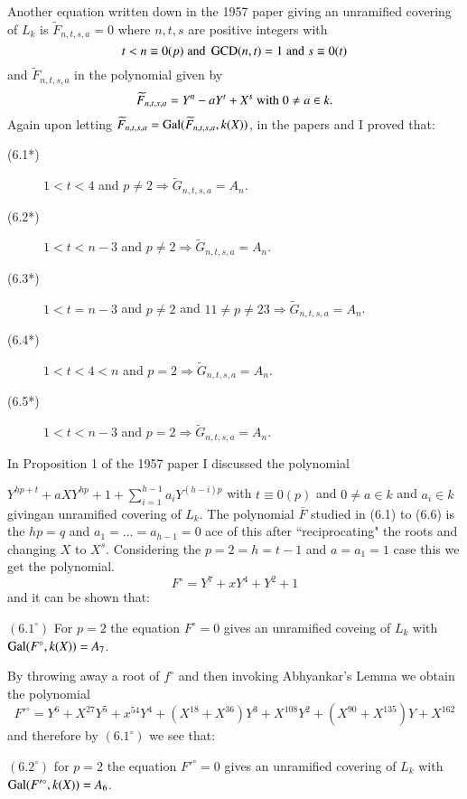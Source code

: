 Another equation written down in the 1957 paper giving an unramified covering of $L_{k}$ is $\widetilde{F}_{n,t,s,a}=0$ where $n,t,s$ are positive integers with
$$
t < n \equiv 0(p)\; {\rm and}\; \operatorname{GCD}(n,t)=1\; {\rm and}\; s \equiv 0(t) 
$$
and $\widetilde{F}_{n,t,s,a}$ in the polynomial given by
$$
\widetilde{F}_{n,t,s,a}=Y^{n}-aY^{t}+X^{s}\; {\rm with}\; 0\neq a \in k. 
$$
Again upon letting $\widetilde{F}_{n,t,s,a}=\operatorname{Gal}(\widetilde{F}_{n,t,s,a}, k(X))$, in the papers \cite{chap1-key8} and \cite{chap1-key10} I proved that:
\begin{description}
\item[{\rm (6.1*)}] $1 < t < 4$ and $p\neq 2 \Rightarrow \widetilde{G}_{n,t,s,a}= A_{n}$.
\item[{\rm (6.2*)}] $1 < t < n-3$ and $p \neq 2 \Rightarrow \widetilde{G}_{n,t,s,a}= A_{n}$.
\item[{\rm (6.3*)}] $1 < t = n-3$ and $p \neq 2$ and $11\neq p \neq 23 \Rightarrow \widetilde{G}_{n,t,s,a}= A_{n}$.
\item[{\rm (6.4*)}] $1 < t < 4 < n$ and $p = 2 \Rightarrow \widetilde{G}_{n,t,s,a}= A_{n}$.
\item[{\rm (6.5*)}] $1 < t < n-3$ and $p = 2 \Rightarrow \widetilde{G}_{n,t,s,a}= A_{n}$.
\end{description} 
In Proposition 1 of the 1957 paper I discussed the polynomial

$Y^{hp+t} +aXY^{hp} + 1 + \sum\limits_{i=1}^{h-1}a_{i}Y^{(h-i)p}$ with $t\equiv 0(p)$ and $0 \neq a \in k$  and $a_{i} \in k $ giving\pageoriginale an unramified covering of $L_{k}$. The polynomial $\overline{F}$ studied in (6.1) to (6.6) is the $hp=q $ and $ a_{1}= \ldots = a_{h-1} =0$ ace of this after ``reciprocating" the roots and changing $X$ to $X^{s}$. Considering the $p=2 =h = t-1$ and $a = a_{1} = 1$ case this we get the polynomial. 
$$
F^{\circ} =Y^{7} +xY^{4}+Y^{2}+1
$$
and it can be shown that:

$(6.1^{\circ})$ For $p=2$ the equation $F^{\circ}=0$ gives an unramified coveing of $L_{k}$ with $\operatorname{Gal}(F^{\circ}, k(X))=A_{7}$.

By throwing away a root of $f^{\circ}$ and then invoking Abhyankar's Lemma we obtain the polynomial
$$ 
F'^{\circ} =Y^{6} +X^{27}Y^{5}+ x^{54}Y^{4} +(X^{18}+X^{36})Y^{3}+X^{108}Y^{2} +(X^{90}+X^{135})Y + X^{162}
$$
and therefore by $(6.1^{\circ})$ we see that:

$(6.2^{\circ})$ for $p=2$ the equation  $F'^{\circ}=0$ gives an unramified covering of $L_{k}$ with $\operatorname{Gal}(F'^{\circ}, k(X))=A_{6}$.

